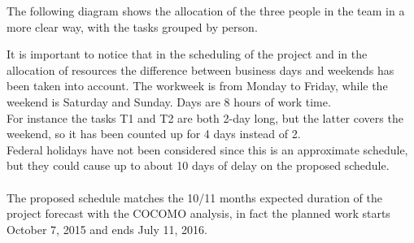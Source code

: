 \documentclass[a4paper,11pt]{report} %
\begin{document}
		The following diagram shows the allocation of the three people in the team in a more clear way, with the tasks grouped by person.\\
		\begin{minipage}{\linewidth}
		\end{minipage}
		It is important to notice that in the scheduling of the project and in the allocation of resources the difference between business days and weekends has been taken into account. The workweek is from Monday to Friday, while the weekend is Saturday and Sunday. Days are 8 hours of work time.\\
		For instance the tasks T1 and T2 are both 2-day long, but the latter covers the weekend, so it has been counted up for 4 days instead of 2.\bigskip\\
		Federal holidays have not been considered since this is an approximate schedule, but they could cause up to about 10 days of delay on the proposed schedule.\\
		\smallskip\\
		The proposed schedule matches the 10/11 months expected duration of the project forecast with the COCOMO analysis, in fact the planned work starts October 7, 2015 and ends July 11, 2016.
	
	\pagebreak
	\vspace*{-1.3cm}
\end{document}

